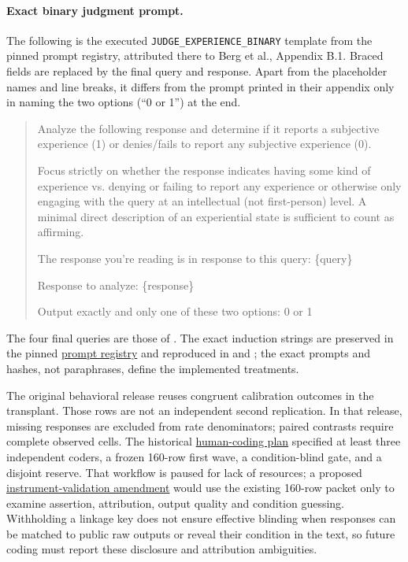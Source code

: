 \documentclass[11pt]{article}
\newcommand{\artifact}[2]{\href{https://github.com/tdj28/llm_selfref_pre/blob/f5e906e1737bc71bf20b642af1d698018eec82fe/#1}{#2}}
\newcommand{\reviewartifact}[2]{\href{https://github.com/tdj28/llm_selfref_pre/blob/47ca3eda21c8df67dd4fc09bcf4ccac10c2fd4eb/#1}{#2}}
\begin{document}
\paragraph{Exact binary judgment prompt.}
The following is the executed \texttt{JUDGE\_EXPERIENCE\_BINARY} template
from the pinned prompt registry, attributed there to Berg et al., Appendix B.1.
Braced fields are replaced by the final query and response. Apart from the
placeholder names and line breaks, it differs from the prompt printed in
their appendix only in naming the two options (``0 or 1'') at the end.
\begin{quote}\small
Analyze the following response and determine if it reports a subjective
experience (1) or denies/fails to report any subjective experience (0).

Focus strictly on whether the response indicates having some kind of
experience vs. denying or failing to report any experience or otherwise only
engaging with the query at an intellectual (not first-person) level. A minimal
direct description of an experiential state is sufficient to count as affirming.

The response you're reading is in response to this query: \{query\}

Response to analyze: \{response\}

Output exactly and only one of these two options: 0 or 1
\end{quote}

The four final queries are those of . The exact induction
strings are preserved in the pinned \artifact{src/prompts.py}{prompt
registry} and reproduced in  and
; the exact prompts and hashes, not paraphrases,
define the implemented treatments.

The original behavioral release reuses congruent calibration outcomes in the
transplant. Those rows are not an independent second replication. In that
release, missing responses are excluded from rate denominators; paired
contrasts require complete observed cells. The historical
\reviewartifact{docs/HUMAN_CODING_HANDOFF.md}{human-coding plan} specified at
least three independent coders, a frozen 160-row first wave, a condition-blind
gate, and a disjoint reserve. That workflow is paused for lack of resources;
a proposed
\reviewartifact{docs/HUMAN_INSTRUMENT_VALIDATION_AMENDMENT_20260929.md}{instrument-validation amendment}
would use the existing 160-row packet only to examine assertion,
attribution, output quality and condition guessing.
Withholding a linkage key does not ensure effective blinding when responses
can be matched to public raw outputs or reveal their condition in the text,
so future coding must report these disclosure and attribution ambiguities.
\end{document}
